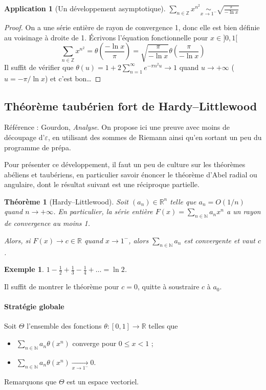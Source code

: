 \documentclass[a4paper, 11pt]{article}
\def\Z{\mathbb{Z}}
\def\N{\mathbb{N}}
\def\R{\mathbb{R}}
\newtheorem*{example}{Exemple}
\newtheorem*{theorem}{Théorème}
\newtheorem*{application}{Application}
\begin{document}
\begin{application}[Un développement asymptotique]
  $\displaystyle \sum_{n \in \Z} x^{n^2} \underset{x \to 1^-}{\sim}
  \sqrt{\frac{\pi}{- \ln x}}$
\end{application}
\begin{proof}
  On a une série entière de rayon de convergence 1, donc elle est bien définie
  au voisinage à droite de 1. Écrivons l'équation fonctionnelle pour $x \in
  ]0,1[$
  \[ \sum_{n \in \Z} x^{n^2} = \theta\left( \frac{- \ln x}{\pi} \right) =
      \sqrt{\frac{\pi}{- \ln x}} \theta\left( \frac{\pi}{- \ln x} \right)
  \]
  Il suffit de vérifier que $\displaystyle \theta(u) = 1 + 2 \sum_{n=1}^\infty
  e^{-\pi n^2 u}\to 1$ quand $u \to +\infty$ ($u = -\pi/\ln x$) et c'est bon…
\end{proof}

\newpage

\subsection{Théorème taubérien fort de Hardy--Littlewood}

Référence : Gourdon, \emph{Analyse}. On propose ici une preuve avec moins de
découpage d'$\varepsilon$, en utilisant des sommes de Riemann ainsi qu'en
sortant un peu du programme de prépa.

Pour présenter ce développement, il faut un peu de culture sur les théorèmes
abéliens et taubériens, en particulier savoir énoncer le théorème d'Abel radial
ou angulaire, dont le résultat suivant est une réciproque partielle.

\begin{theorem}[Hardy--Littlewood]
  Soit $(a_n) \in \R^n$ telle que $a_n = O(1/n)$ quand $n \to +\infty$. En
  particulier, la série entière $F(x) = \sum_{n \in \N} a_n x^n$ a un rayon de
  convergence au moins 1.

  Alors, si $F(x) \to c \in \R$ quand $x \to 1^-$, alors $\sum_{n \in \N} a_n$
  est convergente et vaut $c$.
\end{theorem}

\begin{example}
  $\displaystyle 1 - \frac{1}{2} + \frac{1}{3} - \frac{1}{4} + \ldots = \ln 2$.
\end{example}

Il suffit de montrer le théorème pour $c = 0$, quitte à soustraire $c$ à $a_0$.

\paragraph{Stratégie globale} Soit $\Theta$ l'ensemble des fonctions $\theta :
[0,1] \to \R$ telles que
\begin{itemize}
\item $\displaystyle \sum_{n \in \N} a_n \theta(x^n)$ converge pour $0 \leq x < 1$ ;
\item $\displaystyle \sum_{n \in \N} a_n \theta(x^n) \xrightarrow[x \to 1^{-}]{} 0$.
\end{itemize}
Remarquons que $\Theta$ est un espace vectoriel.
\end{document}
